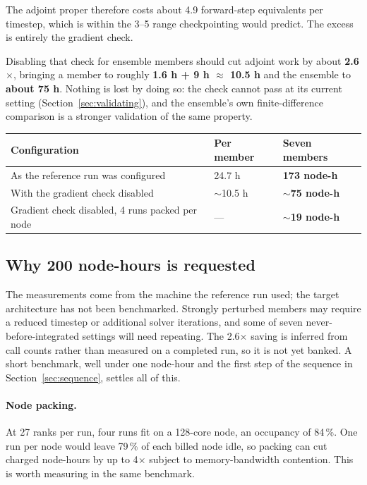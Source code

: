 The adjoint proper therefore costs about 4.9 forward-step equivalents per
timestep, which is within the 3--5 range checkpointing would predict. The excess
is entirely the gradient check.

Disabling that check for ensemble members should cut adjoint work by about
\textbf{2.6$\times$}, bringing a member to roughly
\textbf{1.6 h + 9 h $\approx$ 10.5 h} and the ensemble to \textbf{about 75 h}.
Nothing is lost by doing so: the check cannot pass at its current setting
(Section~\ref{sec:validating}), and the ensemble's own finite-difference
comparison is a stronger validation of the same property.

\begin{center}
\begin{tabularx}{\textwidth}{@{}Y{1.6}Y{0.6}Y{0.8}@{}}
\toprule
\textbf{Configuration} & \textbf{Per member} & \textbf{Seven members}\\
\midrule
As the reference run was configured & 24.7 h & \textbf{173 node-h}\\
With the gradient check disabled & $\sim$10.5 h & \textbf{$\sim$75 node-h}\\
Gradient check disabled, 4 runs packed per node & --- & \textbf{$\sim$19 node-h}\\
\bottomrule
\end{tabularx}
\end{center}

\subsection{Why 200 node-hours is requested}

The measurements come from the machine the reference run used; the target
architecture has not been benchmarked. Strongly perturbed members may require a
reduced timestep or additional solver iterations, and some of seven
never-before-integrated settings will need repeating. The 2.6$\times$ saving is
inferred from call counts rather than measured on a completed run, so it is not
yet banked. A short benchmark, well under one node-hour and the first step of the
sequence in Section~\ref{sec:sequence}, settles all of this.

\paragraph{Node packing.}
At 27 ranks per run, four runs fit on a 128-core node, an occupancy of 84\,\%.
One run per node would leave 79\,\% of each billed node idle, so packing can cut
charged node-hours by up to 4$\times$ subject to memory-bandwidth contention.
This is worth measuring in the same benchmark.

